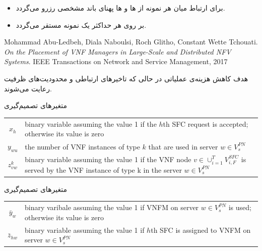 \documentclass{beamer}
\begin{document}
\begin{persian}
\begin{frame}
\begin{itemize}
		\item برای ارتباط میان هر نمونه از ها و ها پهنای باند مشخصی رزرو می‌گردد.
		\item بر روی هر  حداکثر یک نمونه  مستقر می‌گردد.
	\end{itemize}
\end{frame}
\begin{frame}
	\begin{latin}\begin{thebibliography}{9}
		Mohammad Abu-Ledbeh, Diala Naboulsi, Roch Glitho, Constant Wette Tchouati.
		\textit{On the Placement of VNF Managers in Large-Scale and Distributed NFV Systems}. 
		IEEE Transactions on Network and Service Management, 2017
	\end{thebibliography}\end{latin}
	\par
	هدف کاهش هزینه‌ی عملیاتی در حالی که تاخیرهای ارتباطی و محدودیت‌های ظرفیت رعایت می‌شوند.
\end{frame}
\begin{frame}
	\par
	متغیرهای تصمیم‌گیری
	\begin{latin}\begin{tabular}{c p{10cm}}
		$x_h$ & binary variable assuming the value 1 if the $h$th SFC request is accepted; otherwise its value is zero \\
		$y_{wu}$ & the number of VNF instances of type $k$ that are used in server $w \in V_s^{PN}$ \\
		$z^k_{vw}$ & binary variable assuming the value 1 if the VNF node $v \in \cup_{i=1}^{T} V_{i, F}^{SFC}$ is served by the VNF instance of type k in the server $w \in V_s^{PN}$ \\
	\end{tabular}\end{latin}
\end{frame}
\begin{frame}
	\par
	متغیرهای تصمیم‌گیری
	\begin{latin}\begin{tabular}{c p{10cm}}
		$\bar{y}_w$ & binary varibale assuming the value 1 if VNFM on server $w \in V_s^{PN}$ is used; otherwise its value is zero\\
		$\bar{z}_{hw}$ & binary variable assuming the value 1 if $h$th SFC is assigned to VNFM on server $w \in V_s^{PN}$\\
	\end{tabular}\end{latin}

\end{frame}
\end{persian}
\end{document}
